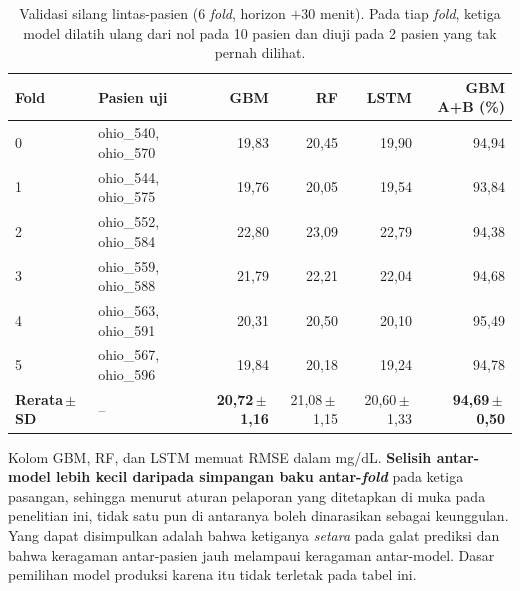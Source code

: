 \begin{table}[htbp]
\centering
\caption{Validasi silang lintas-pasien (6 \emph{fold}, horizon $+30$ menit). Pada tiap \emph{fold}, ketiga model dilatih ulang dari nol pada 10 pasien dan diuji pada 2 pasien yang tak pernah dilihat.}
\label{tab:crossval}
\small
\begin{tabular}{@{}lp{3.4cm}rrrr@{}}
\toprule
\textbf{Fold} & \textbf{Pasien uji} & \textbf{GBM} & \textbf{RF} & \textbf{LSTM} & \textbf{GBM A+B (\%)} \\
\midrule
0 & ohio\_540, ohio\_570 & 19,83 & 20,45 & 19,90 & 94,94 \\
1 & ohio\_544, ohio\_575 & 19,76 & 20,05 & 19,54 & 93,84 \\
2 & ohio\_552, ohio\_584 & 22,80 & 23,09 & 22,79 & 94,38 \\
3 & ohio\_559, ohio\_588 & 21,79 & 22,21 & 22,04 & 94,68 \\
4 & ohio\_563, ohio\_591 & 20,31 & 20,50 & 20,10 & 95,49 \\
5 & ohio\_567, ohio\_596 & 19,84 & 20,18 & 19,24 & 94,78 \\
\midrule
\textbf{Rerata\,$\pm$\,SD} & -- & \textbf{20,72\,$\pm$\,1,16} & 21,08\,$\pm$\,1,15 & 20,60\,$\pm$\,1,33 & \textbf{94,69\,$\pm$\,0,50} \\
\bottomrule
\end{tabular}

\vspace{0.4em}
{\footnotesize Kolom GBM, RF, dan LSTM memuat RMSE dalam mg/dL. \textbf{Selisih antar-model lebih kecil daripada simpangan baku antar-\emph{fold}} pada ketiga pasangan, sehingga menurut aturan pelaporan yang ditetapkan di muka pada penelitian ini, tidak satu pun di antaranya boleh dinarasikan sebagai keunggulan. Yang dapat disimpulkan adalah bahwa ketiganya \emph{setara} pada galat prediksi dan bahwa keragaman antar-pasien jauh melampaui keragaman antar-model. Dasar pemilihan model produksi karena itu tidak terletak pada tabel ini.}
\end{table}

